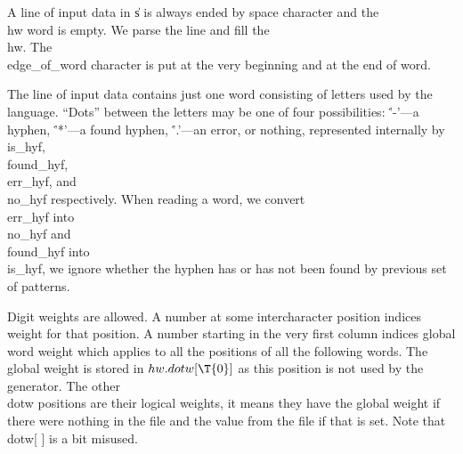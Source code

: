 A line of input data in \|s is always ended by space character and the
\\{hw} word is empty. We parse the line and fill the \\{hw}. The
\\{edge\_of\_word} character is put at the very beginning and at the end of
word.

The line of input data contains just one word consisting of letters used
by the language. ``Dots'' between the letters may be one of four
possibilities: \.{'-'}---a hyphen, \.{'*'}---a found hyphen, \.{'.'}---an
error, or nothing, represented internally by \\{is\_hyf}, \\{found\_hyf},
\\{err\_hyf}, and \\{no\_hyf} respectively. When reading a word, we convert
\\{err\_hyf} into \\{no\_hyf} and \\{found\_hyf} into \\{is\_hyf}, we ignore
whether
the hyphen has or has not been found by previous set of patterns.

Digit weights are allowed. A number at some intercharacter position
indices weight for that position. A number starting in the very first
column indices global word weight which applies to all the positions of all
the following words. The global weight is stored in $\\{hw}.\\{dotw}[\T{0}]$ as
this
position is not used by the generator. The other \\{dotw} positions are their
logical weights, it means they have the global weight if there were nothing
in the file and the value from the file if that is set. Note that \\{dotw}[%
]
is a bit misused.

